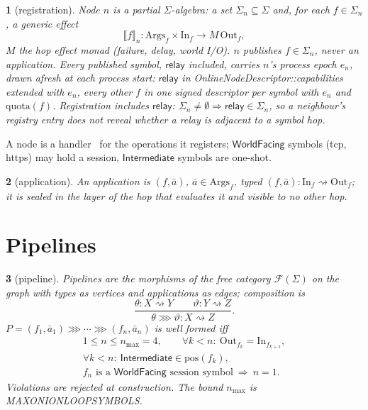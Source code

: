 \documentclass[journal]{IEEEtran}
\newcommand{\namedhead}{}
\newtheorem*{namedenv}{\namedhead}
\newenvironment{defD}[2]{\renewcommand{\namedhead}{Definition #1}%
  \begin{namedenv}[#2]}{\end{namedenv}}
\newcommand{\sem}[1]{\llbracket #1\rrbracket}
\newcommand{\then}{\mathbin{\ggg}}
\newcommand{\relay}{\mathsf{relay}}
\newcommand{\Int}{\mathsf{Intermediate}}
\newcommand{\WF}{\mathsf{WorldFacing}}
\newcommand{\Free}{\mathcal{F}}
\newcommand{\quota}{\mathrm{quota}}
\newcommand{\pos}{\mathrm{pos}}
\newcommand{\Args}{\mathrm{Args}}
\newcommand{\In}{\mathrm{In}}
\newcommand{\Out}{\mathrm{Out}}
\DeclareRobustCommand{\code}[1]{{\ttfamily\renewcommand{\_}{\textunderscore\allowbreak}#1}}
\begin{document}
\begin{defD}{D2}{registration}
Node $n$ is a partial $\Sigma$-algebra: a set $\Sigma_n\subseteq\Sigma$ and,
for each $f\in\Sigma_n$, a generic effect~\cite{Plotkin2003}
\[
\sem{f}_n:\Args_f\times\In_f\to M\,\Out_f ,
\]
$M$ the hop effect monad (failure, delay, world I/O).  $n$ publishes
$f\in\Sigma_n$, never an application.  Every published symbol,
$\relay$ included, carries $n$'s process epoch $e_n$, drawn afresh at each
process start: $\relay$ in \code{OnlineNodeDescriptor::capabilities}
extended with $e_n$, every other $f$ in one signed descriptor per symbol
with $e_n$ and $\quota(f)$.
Registration includes $\relay$: $\Sigma_n\ne\emptyset\Rightarrow\relay\in
\Sigma_n$, so a neighbour's registry entry does not reveal whether a relay
is adjacent to a symbol hop.
\end{defD}

A node is a handler~\cite{Plotkin2009} for the operations it registers;
$\WF$ symbols (\code{tcp}, \code{https}) may hold a session, $\Int$ symbols
are one-shot.

\begin{defD}{D3}{application}
An application is $(f,\bar a)$, $\bar a\in\Args_f$, typed
$(f,\bar a):\In_f\rightsquigarrow\Out_f$; it is sealed in the layer of the
hop that evaluates it and visible to no other hop.
\end{defD}

\section{Pipelines}\label{sec:pipeline}

\begin{defD}{D4a}{pipeline}
Pipelines are the morphisms of the free category $\Free(\Sigma)$ on the
graph with types as vertices and applications as edges; composition is
\[
\frac{\theta:X\rightsquigarrow Y\qquad \vartheta:Y\rightsquigarrow Z}
     {\theta\then\vartheta:X\rightsquigarrow Z}.
\]
$P=(f_1,\bar a_1)\then\cdots\then(f_n,\bar a_n)$ is well formed iff
\begin{gather*}
1\le n\le n_{\max}=4,\qquad\forall k<n:\ \Out_{f_k}=\In_{f_{k+1}},\\
\forall k<n:\ \Int\in\pos(f_k),\\
f_n\text{ is a }\WF\text{ session symbol}\ \Rightarrow\ n=1 .
\end{gather*}
Violations are rejected at construction.  The bound $n_{\max}$ is
\code{MAX\_ONION\_LOOP\_SYMBOLS}.
\end{defD}
\end{document}
